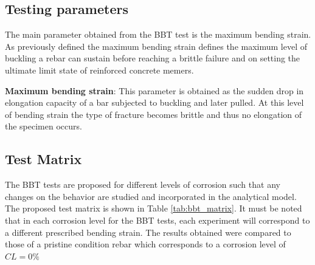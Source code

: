 \newpage

\subsection{Testing parameters}

The main parameter obtained from the BBT test is the maximum bending strain. As previously defined the maximum bending strain defines the maximum level of buckling a rebar can sustain before reaching a brittle failure and on setting the ultimate limit state of reinforced concrete memers.

\textbf{Maximum bending strain}: This parameter is obtained as the sudden drop in elongation capacity of a bar subjected to buckling and later pulled. At this level of bending strain the type of fracture becomes brittle and thus no elongation of the specimen occurs.

\subsection{Test Matrix}
The BBT tests are proposed for different levels of corrosion such that any changes on the behavior are studied and incorporated in the analytical model. The proposed test matrix is shown in Table \ref{tab:bbt_matrix}. It must be noted that in each corrosion level for the BBT tests, each experiment will correspond to a different prescribed bending strain. The results obtained were compared to those of a pristine condition rebar which corresponds to a corrosion level of $CL=0\%$

